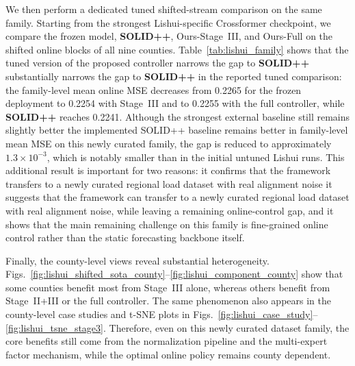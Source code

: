 ﻿\documentclass[journal]{IEEEtran}
\DeclareRobustCommand{\oldtext}[1]{{\color{revisionred}#1}}
\DeclareRobustCommand{\newtext}[1]{{\color{revisionblue}#1}}
\DeclareRobustCommand{\why}[1]{{\color{revisionblue}{\footnotesize (#1)}}}
\DeclareRobustCommand{\rw}[3]{\oldtext{#1} \newtext{#2}\why{#3}}
\begin{document}
We then perform a dedicated tuned shifted-stream comparison on the same family. Starting from the strongest Lishui-specific Crossformer checkpoint, we compare the frozen model, \textbf{SOLID++}, Ours-Stage~III, and Ours-Full on the shifted online blocks of all nine counties. Table~\ref{tab:lishui_family} shows that the tuned version of the proposed controller \rw{narrows the gap to \textbf{SOLID++} substantially}{narrows the gap to \textbf{SOLID++} in the reported tuned comparison}{去除 substantially，避免无统计支撑。}: the family-level mean online MSE decreases from 0.2265 for the frozen deployment to 0.2254 with Stage~III and to 0.2255 with the full controller, while \textbf{SOLID++} reaches 0.2241. Although \rw{the strongest external baseline still remains slightly better}{the implemented SOLID++ baseline remains better in family-level mean MSE}{避免 external/strongest 未核验，直接陈述表格事实。} on this newly curated family, the gap is reduced to approximately $1.3\times 10^{-3}$, which is notably smaller than in the initial untuned Lishui runs. This additional result is important for two reasons: \rw{it confirms that the framework transfers to a newly curated regional load dataset with real alignment noise}{it suggests that the framework can transfer to a newly curated regional load dataset with real alignment noise, while leaving a remaining online-control gap}{更准确体现证据和剩余差距。}, and it shows that the main remaining challenge on this family is fine-grained online control rather than the static forecasting backbone itself.

Finally, the county-level views reveal substantial heterogeneity. Figs.~\ref{fig:lishui_shifted_sota_county}--\ref{fig:lishui_component_county} show that some counties benefit most from Stage~III alone, whereas others benefit from Stage~II+III or the full controller. The same phenomenon also appears in the county-level case studies and t-SNE plots in Figs.~\ref{fig:lishui_case_study}--\ref{fig:lishui_tsne_stage3}. Therefore, even on this newly curated dataset family, the core benefits still come from the normalization pipeline and the multi-expert factor mechanism, while the optimal online policy remains county dependent.
\end{document}
